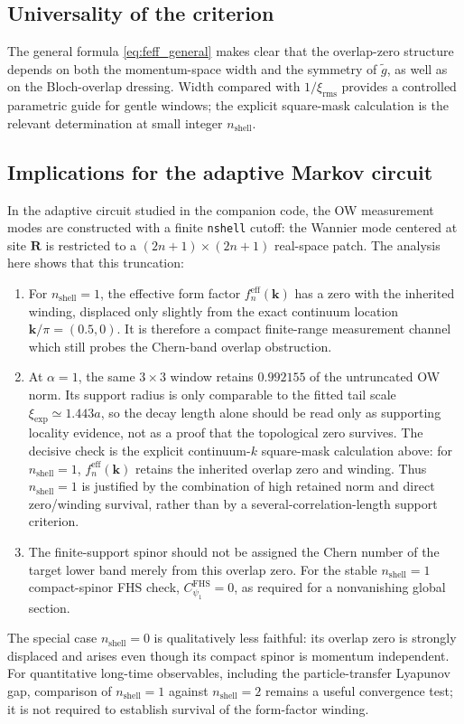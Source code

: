 \documentclass[aps,prb,onecolumn,nofootinbib,superscriptaddress]{revtex4-2}
\newcommand{\mbf}[1]{\mathbf{#1}}
\begin{document}
\subsection{Universality of the criterion}

The general formula \eqref{eq:feff_general} makes clear that the overlap-zero structure depends on both the momentum-space width and the symmetry of $\tilde{g}$, as well as on the Bloch-overlap dressing.  Width compared with $1/\xi_{\mathrm{rms}}$ provides a controlled parametric guide for gentle windows; the explicit square-mask calculation is the relevant determination at small integer $n_{\mathrm{shell}}$.

\subsection{Implications for the adaptive Markov circuit}

In the adaptive circuit studied in the companion code, the OW measurement modes are constructed with a finite \texttt{nshell} cutoff: the Wannier mode centered at site $\mbf{R}$ is restricted to a $(2n+1)\times(2n+1)$ real-space patch. The analysis here shows that this truncation:
\begin{enumerate}
\item For $n_{\mathrm{shell}}=1$, the effective form factor $f_n^{\mathrm{eff}}(\mbf{k})$ has a zero with the inherited winding, displaced only slightly from the exact continuum location $\mbf{k}/\pi=(0.5,0)$.  It is therefore a compact finite-range measurement channel which still probes the Chern-band overlap obstruction.
\item At $\alpha=1$, the same $3\times3$ window retains $0.992155$ of the untruncated OW norm.  Its support radius is only comparable to the fitted tail scale $\xi_{\mathrm{exp}}\simeq1.443a$, so the decay length alone should be read only as supporting locality evidence, not as a proof that the topological zero survives.  The decisive check is the explicit continuum-$k$ square-mask calculation above: for $n_{\mathrm{shell}}=1$, $f_n^{\mathrm{eff}}(\mbf{k})$ retains the inherited overlap zero and winding.  Thus $n_{\mathrm{shell}}=1$ is justified by the combination of high retained norm and direct zero/winding survival, rather than by a several-correlation-length support criterion.
\item The finite-support spinor should not be assigned the Chern number of the target lower band merely from this overlap zero.  For the stable $n_{\mathrm{shell}}=1$ compact-spinor FHS check, $C_{\psi_1}^{\mathrm{FHS}}=0$, as required for a nonvanishing global section.
\end{enumerate}
The special case $n_{\mathrm{shell}}=0$ is qualitatively less faithful: its overlap zero is strongly displaced and arises even though its compact spinor is momentum independent.  For quantitative long-time observables, including the particle-transfer Lyapunov gap, comparison of $n_{\mathrm{shell}}=1$ against $n_{\mathrm{shell}}=2$ remains a useful convergence test; it is not required to establish survival of the form-factor winding.
\end{document}
